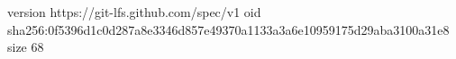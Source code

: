 version https://git-lfs.github.com/spec/v1
oid sha256:0f5396d1c0d287a8e3346d857e49370a1133a3a6e10959175d29aba3100a31e8
size 68
